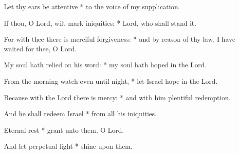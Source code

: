 \item Let thy ears be attentive * to the voice of my supplication.
\item If thou, O Lord, wilt mark iniquities: * Lord, who shall stand it.
\item For with thee there is merciful forgiveness: * and by reason of thy law, I have waited for thee, O Lord.
\item My soul hath relied on his word: * my soul hath hoped in the Lord.
\item From the morning watch even until night, * let Israel hope in the Lord.
\item Because with the Lord there is mercy: * and with him plentiful redemption.
\item And he shall redeem Israel * from all his iniquities.
\item Eternal rest * grant unto them, O Lord.
\item And let perpetual light * shine upon them.
